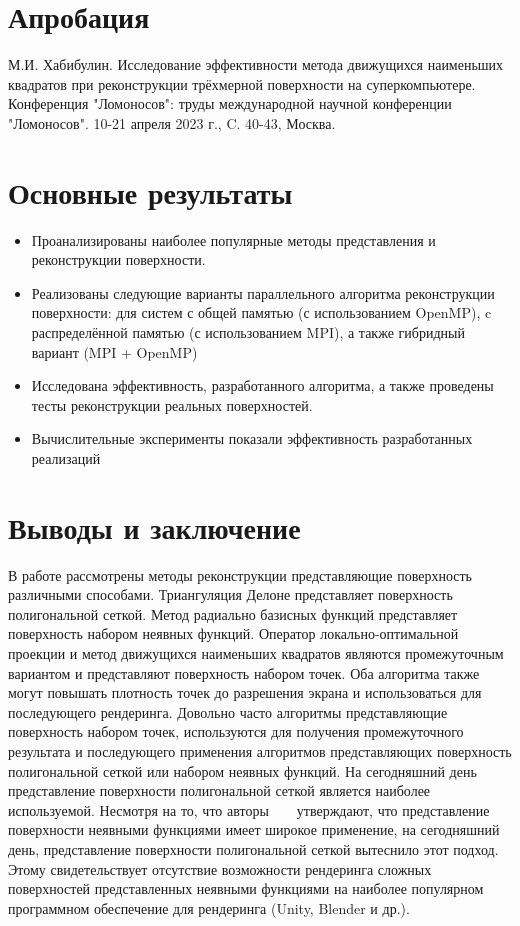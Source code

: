 
\section*{Апробация} 
М.И. Хабибулин. Исследование эффективности метода движущихся наименьших квадратов при реконструкции трёхмерной поверхности на суперкомпьютере.  Конференция "Ломоносов": труды международной научной конференции "Ломоносов". 10-21 апреля 2023 г., C. 40-43, Москва.

\section*{Основные результаты}
\begin{itemize}
    \item Проанализированы наиболее популярные методы представления и реконструкции поверхности.
    \item Реализованы следующие варианты параллельного алгоритма реконструкции поверхности:
для систем с общей памятью (с использованием OpenMP), c распределённой памятью (с использованием MPI),
а также гибридный вариант (MPI + OpenMP)
    \item Исследована эффективность, разработанного алгоритма, а также проведены тесты реконструкции реальных поверхностей.
    \item Вычислительные эксперименты показали эффективность разработанных реализаций
\end{itemize}

\section*{Выводы и заключение}
В работе рассмотрены методы реконструкции представляющие поверхность различными способами. Триангуляция Делоне представляет поверхность полигональной сеткой. Метод радиально базисных функций представляет поверхность набором неявных функций.
Оператор локально-оптимальной проекции и метод движущихся наименьших квадратов являются промежуточным вариантом и представляют поверхность набором точек. Оба алгоритма также могут повышать плотность точек до разрешения экрана и использоваться для последующего рендеринга. Довольно часто алгоритмы представляющие поверхность набором точек, используются для получения промежуточного результата и последующего применения алгоритмов представляющих поверхность полигональной сеткой или набором неявных функций. На сегодняшний день представление поверхности полигональной сеткой является наиболее используемой. Несмотря на то, что авторы ~\cite{CARR} ~\cite{Turk} утверждают, что представление поверхности неявными функциями имеет широкое применение, на сегодняшний день, представление поверхности полигональной сеткой вытеснило этот подход. Этому свидетельствует отсутствие возможности рендеринга сложных поверхностей представленных неявными функциями на наиболее популярном программном обеспечение для рендеринга (Unity, Blender и др.).

